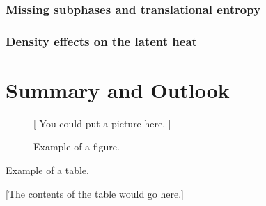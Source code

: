 \documentclass[12pt]{report}
\begin{document}
\subsection{Missing subphases and translational entropy}
\subsection{Density effects on the latent heat}

\chapter{Summary and Outlook}










\begin{figure}
\centerline{[ You could put a picture here. ]}
\caption{Example of a figure.}
\end{figure}

\begin{table}
\caption{Example of a table.}
\centerline{[The contents of the table would go here.]}
\end{table}
\end{document}
